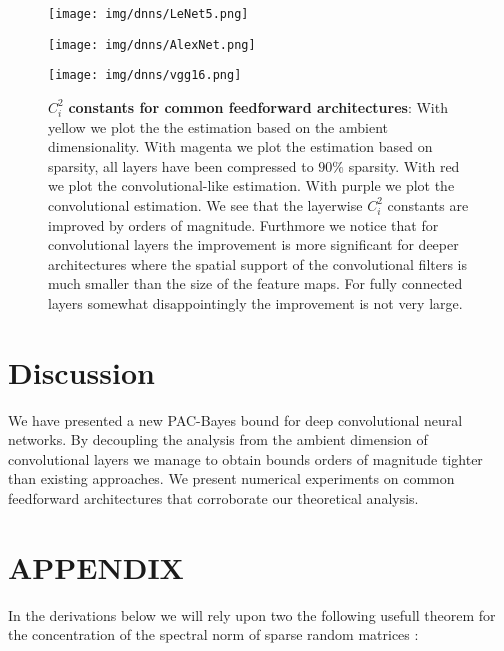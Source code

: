\documentclass{article} %
\theoremstyle{definition}
\begin{document}
\begin{figure}[h!]
\centering

{\texttt{[image: img/dnns/LeNet5.png]}}

{\texttt{[image: img/dnns/AlexNet.png]}}

{\texttt{[image: img/dnns/vgg16.png]}}

\caption{$C^2_i$ \textbf{constants for common feedforward architectures}: With yellow we plot the the estimation based on the ambient dimensionality. With magenta we plot the estimation based on sparsity, all layers have been compressed to $90\%$ sparsity. With red we plot the convolutional-like estimation. With purple we plot the convolutional estimation. We see that the layerwise $C^2_i$ constants are improved by orders of magnitude. Furthmore we notice that for convolutional layers the improvement is more significant for deeper architectures where the spatial support of the convolutional filters is much smaller than the size of the feature maps. For fully connected layers somewhat disappointingly the improvement is not very large. }
\end{figure}  


\section{Discussion}
We have presented a new PAC-Bayes bound for deep convolutional neural networks. By decoupling the analysis from the ambient dimension of convolutional layers we manage to obtain bounds orders of magnitude tighter than existing approaches. We present numerical experiments on common feedforward architectures that corroborate our theoretical analysis.





\clearpage


\section{APPENDIX}
In the derivations below we will rely upon two the following usefull theorem for the concentration of the spectral norm of sparse random matrices \citet{bandeira2016sharp}: 
\end{document}
